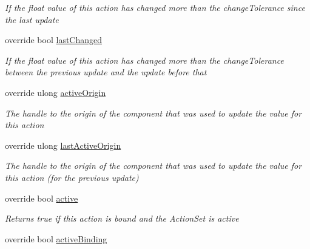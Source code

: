 \begin{DoxyCompactItemize}
\begin{DoxyCompactList}\small\item\em If the float value of this action has changed more than the change\+Tolerance since the last update \end{DoxyCompactList}\item 
override bool \mbox{\hyperlink{class_valve_1_1_v_r_1_1_steam_v_r___action___single___source_a29f288991064a3aeedb29fc874e216f9}{last\+Changed}}
\begin{DoxyCompactList}\small\item\em If the float value of this action has changed more than the change\+Tolerance between the previous update and the update before that \end{DoxyCompactList}\item 
override ulong \mbox{\hyperlink{class_valve_1_1_v_r_1_1_steam_v_r___action___single___source_aeb38aaadcddbba6f2c99726e683d4413}{active\+Origin}}
\begin{DoxyCompactList}\small\item\em The handle to the origin of the component that was used to update the value for this action \end{DoxyCompactList}\item 
override ulong \mbox{\hyperlink{class_valve_1_1_v_r_1_1_steam_v_r___action___single___source_aefb428810828fd6044907d78cf44007e}{last\+Active\+Origin}}
\begin{DoxyCompactList}\small\item\em The handle to the origin of the component that was used to update the value for this action (for the previous update) \end{DoxyCompactList}\item 
override bool \mbox{\hyperlink{class_valve_1_1_v_r_1_1_steam_v_r___action___single___source_a4e9b3c6ca9bb660cba7fd54aeb9bcce0}{active}}
\begin{DoxyCompactList}\small\item\em Returns true if this action is bound and the Action\+Set is active \end{DoxyCompactList}\item 
override bool \mbox{\hyperlink{class_valve_1_1_v_r_1_1_steam_v_r___action___single___source_a7c32a1ecef3cb4fb278f0932410bb5e8}{active\+Binding}}

\end{DoxyCompactItemize}
